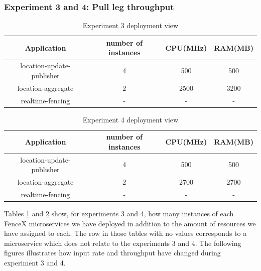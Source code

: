 \documentclass[a4]{report}
\begin{document}
    \subsubsection{Experiment 3 and 4: Pull leg throughput}
    \begin{table}[h!]
        \centering
        \begin{tabular}{|c|c|c|c|}
            \hline
            Application               & number of instances & CPU(MHz) & RAM(MB) \\
            \hline
            location-update-publisher & 4                   & 500      & 500     \\
            location-aggregate        & 2                   & 2500     & 3200    \\
            realtime-fencing          & -                   & -        & -       \\
            \hline
        \end{tabular}
        \caption{Experiment 3 deployment view}
        \label{table:ex3-dv}
    \end{table}

    \begin{table}[h!]
        \centering
        \begin{tabular}{|c|c|c|c|}
            \hline
            Application               & number of instances & CPU(MHz) & RAM(MB) \\
            \hline
            location-update-publisher & 4                   & 500      & 500     \\
            location-aggregate        & 2                   & 2700     & 2700    \\
            realtime-fencing          & -                   & -        & -       \\
            \hline
        \end{tabular}
        \caption{Experiment 4 deployment view}
        \label{table:ex4-dv}
    \end{table}


    Tables \ref{table:ex3-dv} and \ref{table:ex4-dv} show, for experiments 3 and 4, how many instances of each FenceX
    microservices we have deployed in addition to the amount of resources we have assigned to each.
    The row in those tables with no values corresponds to a microservice which does not relate to the experiments 3
    and 4.
    The following figures illustrates how input rate and throughput have changed during experiment 3 and 4.
\end{document}
